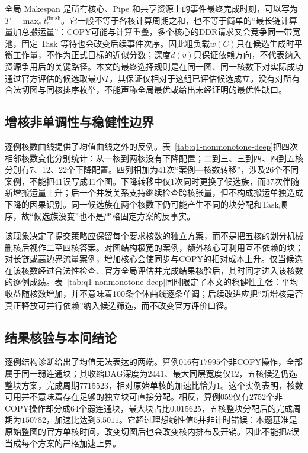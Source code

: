 全局 Makespan 是所有核心、Pipe 和共享资源上的事件最终完成时刻，可以写为 $T=\max_e t_e^{\mathrm{finish}}$。它一般不等于各核计算周期之和，也不等于简单的“最长链计算量加总搬运量”：COPY可能与计算重叠，多个核心的DDR请求又会竞争同一带宽池，固定 Task 等待也会改变后续事件次序。因此粗负载$w(C)$只在候选生成时平衡工作量，不作为正式目标的近似分数；深度$d(v)$只保证依赖方向，不代表纳入资源争用后的关键路径。本文的最终选择规则是在同一图、同一核数下对实际成功通过官方评估的候选取最小$T$，其保证仅相对于这组已评估候选成立。没有对所有合法切图与同核排序枚举，不能声称全局最优或给出未经证明的最优性缺口。

\subsection{增核非单调性与稳健性边界}

逐例核数曲线提供了均值曲线之外的反例。表~\ref{tab:q1-nonmonotone-deep}把四次相邻核数变化分别统计：从一核到两核没有下降配置；二到三、三到四、四到五核分别有7、12、22个下降配置。四列相加为41次“案例—核数转移”，涉及26个不同案例，不能把41误写成41个图。下降转移中仅1次同时更换了候选族，而37次伴随新增搬运量上升；后一个并发关系支持继续检查跨核张量，但不构成搬运单独造成下降的因果识别。同一候选族在两个核数下仍可能产生不同的块分配和Task顺序，故“候选族没变”也不是严格固定方案的反事实。

该现象决定了提交策略应保留每个要求核数的独立方案，而不是把五核的划分机械删核后视作二至四核答案。对图结构极宽的案例，额外核心可利用互不依赖的块；对长链或高边界流量案例，增加核心会使同步与COPY的相对成本上升。仅当候选在该核数经过合法性检查、官方全局评估并完成结果核验后，其时间才进入该核数的逐例成绩。表~\ref{tab:q1-nonmonotone-deep}同时限定了本文的稳健性主张：平均收益随核数增加，并不意味着100条个体曲线逐条单调；后续改进应把“新增核是否真正释放可并行依赖”纳入候选筛选，而不改变官方评价口径。

\subsection{结果核验与本问结论}

逐例结构诊断给出了均值无法表达的两端。算例016有$17995$个非COPY操作，全部属于同一弱连通块；其收缩DAG深度为$2441$、最大同层宽度仅$12$，五核候选仍选整块方案，完成周期$7715523$，相对原始单核的加速比恰为$1$。这个实例表明，核数可用并不意味着存在足够的独立块可直接分配。相反，算例059仅有$2752$个非COPY操作却分成$64$个弱连通块，最大块占比$0.015625$，五核整块分配后的完成周期为$150782$，加速比达到$5.5011$。它超过理想线性值$5$并非计时错误：本题基准是原始整图的官方单核时间，改变切图后也会改变核内排布及开销。因此不能把$k$误当成每个方案的严格加速上界。

